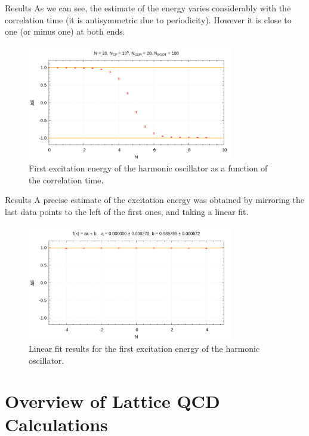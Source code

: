 \documentclass[10pt]{beamer}
\begin{document}
\begin{frame}{Results}
As we can see, the estimate of the energy varies considerably with the correlation time (it is antisymmetric due to periodicity). However it is close to one (or minus one) at both ends. 
\begin{figure}
\includegraphics[width=0.8\textwidth]{HOEnergies.png}
\caption{First excitation energy of the harmonic oscillator as a function of the correlation time.}
\end{figure}
\end{frame}


\begin{frame}{Results}
A precise estimate of the excitation energy was obtained by mirroring the last data points to the left of the first ones, and taking a linear fit.
\begin{figure}
\includegraphics[width=0.8\textwidth]{Fit.png}
\caption{Linear fit results for the first excitation energy of the harmonic oscillator.}
\end{figure}
\end{frame}


\section{Overview of Lattice QCD Calculations}
\end{document}

